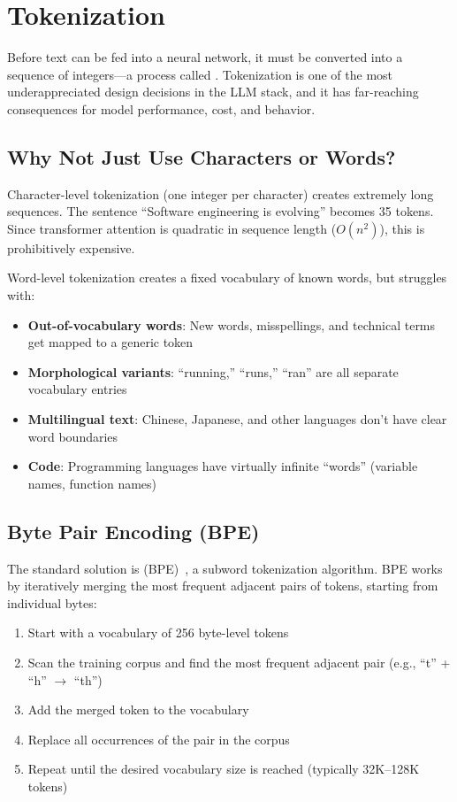 \section{Tokenization}
\label{sec:tokenization}

Before text can be fed into a neural network, it must be converted into a sequence of integers---a process called . Tokenization is one of the most underappreciated design decisions in the LLM stack, and it has far-reaching consequences for model performance, cost, and behavior.

\subsection{Why Not Just Use Characters or Words?}

Character-level tokenization (one integer per character) creates extremely long sequences. The sentence ``Software engineering is evolving'' becomes 35 tokens. Since transformer attention is quadratic in sequence length ($O(n^2)$), this is prohibitively expensive.

Word-level tokenization creates a fixed vocabulary of known words, but struggles with:
\begin{itemize}[leftmargin=*]
    \item \textbf{Out-of-vocabulary words}: New words, misspellings, and technical terms get mapped to a generic  token
    \item \textbf{Morphological variants}: ``running,'' ``runs,'' ``ran'' are all separate vocabulary entries
    \item \textbf{Multilingual text}: Chinese, Japanese, and other languages don't have clear word boundaries
    \item \textbf{Code}: Programming languages have virtually infinite ``words'' (variable names, function names)
\end{itemize}

\subsection{Byte Pair Encoding (BPE)}

The standard solution is  (BPE)~\cite{sennrich2016bpe}, a subword tokenization algorithm. BPE works by iteratively merging the most frequent adjacent pairs of tokens, starting from individual bytes:

\begin{enumerate}[leftmargin=*]
    \item Start with a vocabulary of 256 byte-level tokens
    \item Scan the training corpus and find the most frequent adjacent pair (e.g., ``t'' + ``h'' $\rightarrow$ ``th'')
    \item Add the merged token to the vocabulary
    \item Replace all occurrences of the pair in the corpus
    \item Repeat until the desired vocabulary size is reached (typically 32K--128K tokens)
\end{enumerate}


